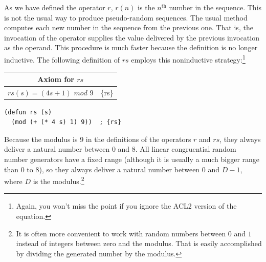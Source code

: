 As we have defined the operator $r$, $r(n)$ is the
$n^\text{th}$ number in the sequence.
This is not the usual way to produce pseudo-random sequences.
The usual method computes each new number in the sequence from the previous one.
That is, the invocation of the operator
supplies the value delivered by the previous invocation as
the operand. This procedure is much faster
because the definition is no longer inductive.
The following definition of $rs$
employs this noninductive strategy:\footnote{Again, you won't miss the point
if you ignore the ACL2 version of the equation.}

\begin{center}
\begin{tabular}{ll}
\multicolumn{2}{c}{Axiom for $rs$}\\
\hline
$rs(s) = (4s + 1)$ $mod$ $9$ & \{rs\}\\
\end{tabular}
\end{center}
\begin{code}
\begin{verbatim}
(defun rs (s)
  (mod (+ (* 4 s) 1) 9))  ; {rs}
\end{verbatim}
\end{code}

Because the modulus is 9 in the definitions of the operators
$r$ and $rs$, they always deliver a natural number between 0 and 8.
All linear congruential random number generators
have a fixed range (although it is usually a much bigger range than 0 to 8),
so they always deliver
a natural number between 0 and $D-1$, where $D$ is the modulus.\footnote{It
is often more convenient to work with random numbers between $0$ and $1$
instead of integers between zero and the modulus.
That is easily accomplished by dividing the generated number
by the modulus.}

